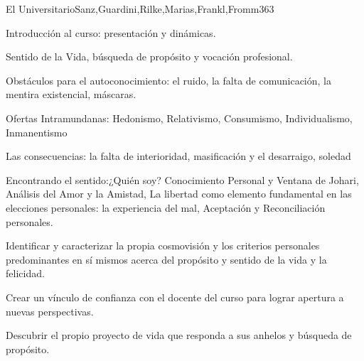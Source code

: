 \begin{syllabus}
\begin{unit}{El Universitario}{Sanz,Guardini,Rilke,Marias,Frankl,Fromm}{36}{3}
\begin{topics}
	\item Introducción al curso: presentación y dinámicas.
	\item Sentido de la Vida, búsqueda de propósito y vocación profesional.
	\item Obstáculos para el autoconocimiento: el ruido, la falta de comunicación, la mentira existencial, máscaras.
	\item Ofertas Intramundanas: Hedonismo, Relativismo, Consumismo, Individualismo, Inmanentismo
	\item Las consecuencias: la falta de interioridad, masificación y el desarraigo, soledad
	\item Encontrando el sentido:¿Quién soy? Conocimiento Personal y Ventana de Johari, Análisis del Amor y la Amistad, La libertad como elemento fundamental en las elecciones personales: la experiencia del mal, Aceptación y Reconciliación personales.
\end{topics}
\begin{learningoutcomes}
	\item Identificar y caracterizar la propia cosmovisión y los criterios personales predominantes en sí mismos acerca del propósito y sentido de la vida y la felicidad.
	\item Crear un vínculo de confianza con el docente del curso para lograr apertura a nuevas perspectivas.
	\item Descubrir el propio proyecto de vida que responda a sus anhelos y búsqueda de propósito.
\end{learningoutcomes}
\end{unit}


\end{syllabus}
